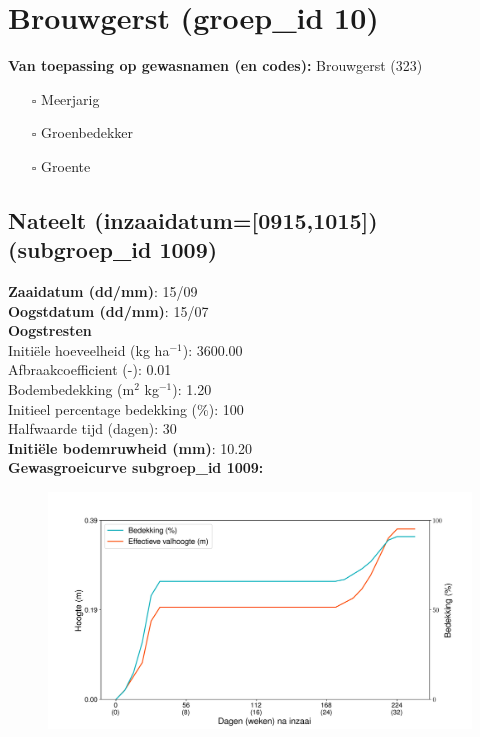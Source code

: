 \documentclass{article}
\begin{document}
 \section{Brouwgerst (groep\_id 10)} 
 \textbf{Van toepassing op gewasnamen (en codes):} Brouwgerst (323) 
 \begin{multicols}{3} \begin{itemize} \item[$\square$] Meerjarig \item[$\square$] Groenbedekker \item[$\square$] Groente \end{itemize} \end{multicols} 
 \subsection{Nateelt (inzaaidatum=[0915,1015]) (subgroep\_id 1009)} 
  \textbf{Zaaidatum (dd/mm)}: 15/09  \vspace{0.10cm} \\ 
  \textbf{Oogstdatum (dd/mm)}: 15/07  \vspace{0.10cm} \\ 
  \textbf{Oogstresten} \vspace{0.05cm} \\ 
  \tab Initi\"{e}le hoeveelheid (kg ha$^{-1}$): 3600.00 \vspace{0.05cm} \\ 
  \tab Afbraakcoefficient (-): 0.01 \vspace{0.05cm} \\ 
  \tab Bodembedekking (m$^2$ kg$^{-1}$): 1.20 \vspace{0.05cm} \\ 
  \tab Initieel percentage bedekking (\%): 100 \vspace{0.05cm} \\ 
  \tab Halfwaarde tijd (dagen): 30 \vspace{0.05cm} \\ 
  \textbf{Initi\"{e}le bodemruwheid (mm)}: 10.20 \vspace{0.05cm} \\ 
  \textbf{Gewasgroeicurve subgroep\_id 1009:} 
 \begin{center} \begin{figure}[H] \includegraphics[width=12.5cm]{temp/1009.png} \end{figure} \end{center} 
\end{document}

